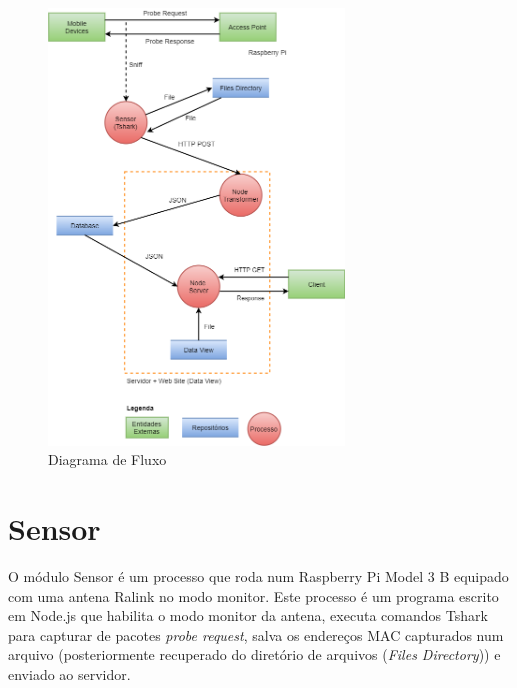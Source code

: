 \begin{figure}[!h]
  \caption{\label{diagrama-fluxo}Diagrama de Fluxo}
  \begin{center}
    \includegraphics[width=0.70\textwidth]{img/diagrama_fluxo.png}
  \end{center}
\end{figure}


\section{Sensor}
\label{secao-sensor}
O módulo Sensor é um processo que roda num Raspberry Pi Model 3 B equipado com uma antena Ralink no modo monitor. Este processo é um programa escrito em Node.js que habilita o modo monitor da antena, executa comandos Tshark para capturar de pacotes \emph{probe request}, salva os endereços MAC capturados num arquivo (posteriormente recuperado do diretório de
arquivos (\emph{Files Directory})) e enviado ao servidor.

